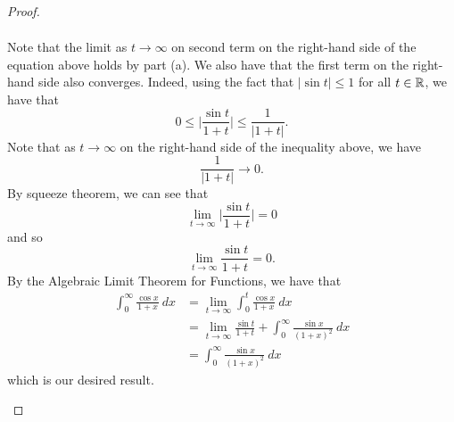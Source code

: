 \documentclass[a4paper]{article}
\begin{document}
\begin{proof}
\begin{enumerate}
\begin{align*}
\end{align*}
Note that the limit as \( t \to \infty   \) on second term on the right-hand side of the equation above holds by part (a). We also have that the first term on the right-hand side also converges. Indeed, using the fact that \( | \sin t  |  \leq 1  \) for all \( t \in \mathbb{R}  \), we have that 
\[ 0 \leq \Big| \frac{ \sin t  }{  1 + t  }  \Big| \leq \frac{ 1  }{ | 1 + t |  }. \]
Note that as \( t \to \infty    \) on the right-hand side of the inequality above, we have 
\[  \frac{ 1 }{ | 1+ t |   } \to 0.  \]
By squeeze theorem, we can see that 
\[  \lim_{ t \to \infty  } \Big| \frac{ \sin t  }{ 1 + t }  \Big|   = 0    \]
and so 
\[  \lim_{ t \to \infty  } \frac{ \sin t  }{  1 + t  }  = 0.  \]
By the Algebraic Limit Theorem for Functions, we have that 
\begin{align*}
    \int_{ 0 }^{ \infty  } \frac{ \cos x  }{  1 + x  }  \ dx &= \lim_{ t \to \infty  }  \int_{ 0 }^{ t }  \frac{ \cos x  }{ 1 + x  }  \ dx \\
                                                             &= \lim_{ t \to \infty  }  \frac{ \sin t  }{  1 + t  } + \int_{ 0 }^{ \infty  } \frac{ \sin x  }{  (1+x)^{2} }  \ dx  \\
                                                             &= \int_{ 0 }^{ \infty  } \frac{ \sin x  }{  (1+x)^{2} }  \ dx
\end{align*}
which is our desired result.
\end{enumerate}
\end{proof}
\end{document}

